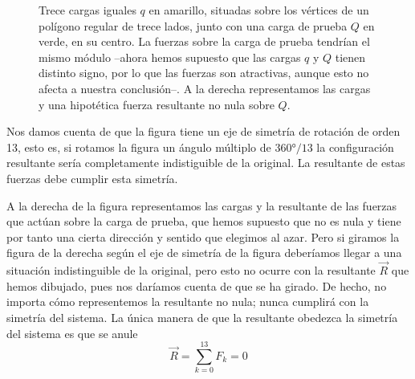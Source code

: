 \documentclass[a4paper,10pt]{article}
\begin{document}
\begin{soluc}
\begin{enumerate}
\begin{figure}[ht]
\begin{minipage}{0.45\linewidth}
  \end{minipage}
\hspace{2em}
    \begin{minipage}{0.45\linewidth}
\end{minipage}

\caption{Trece cargas iguales $q$ en amarillo, situadas sobre los vértices de
  un polígono regular de trece lados, junto con una carga de prueba $Q$ en
  verde, en su centro. La fuerzas sobre la carga  de prueba tendrían el mismo
  módulo --ahora hemos supuesto que las cargas $q$ y $Q$ tienen distinto signo,
  por lo que las fuerzas son atractivas, aunque esto no afecta a nuestra
  conclusión--. A la derecha representamos las cargas y una hipotética fuerza
  resultante no nula sobre $Q$.}
\label{fig:cargas_en_tridecagono_sin_etiquetar}
\end{figure}

Nos damos cuenta de que la figura tiene un eje de simetría de rotación de
orden 13, esto es, si rotamos la figura un ángulo múltiplo de $\ang{360}/13$ la
configuración resultante sería completamente indistiguible de la original.
La resultante de estas fuerzas debe cumplir esta simetría.

A la derecha de la figura representamos las cargas y la resultante de las fuerzas
que actúan sobre la carga de prueba, que hemos supuesto que no es nula y tiene
por tanto una cierta dirección y sentido que elegimos al azar. 
Pero si giramos la figura de la derecha según el eje de simetría de la figura
deberíamos llegar a una situación indistinguible de la original, pero esto
no ocurre con la resultante $\vec{R}$ que hemos dibujado, pues nos daríamos cuenta
de que se ha girado. De hecho, no importa cómo representemos la resultante no
nula; nunca cumplirá con la simetría del sistema.
La única manera de que la resultante obedezca la simetría del sistema es que
se anule
\[
  \vec{R} = \sum_{k=0}^{13} F_{k} = 0
\]


\end{enumerate}
\end{soluc}
\end{document}
